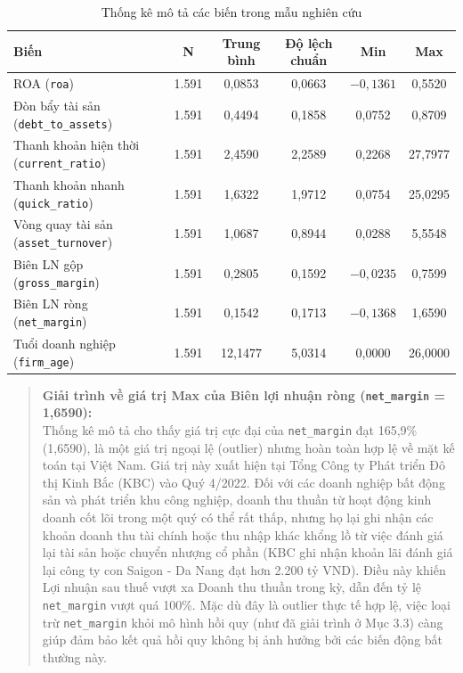 \documentclass[12pt,a4paper]{article}
\begin{document}
\begin{table}[htbp]
\centering
\caption{Thống kê mô tả các biến trong mẫu nghiên cứu}
\label{tab:descriptive}
\begin{tabular}{lccccc}
\toprule
\textbf{Biến} & \textbf{N} & \textbf{Trung bình} & \textbf{Độ lệch chuẩn} & \textbf{Min} & \textbf{Max} \\
\midrule
ROA (\texttt{roa}) & 1.591 & 0,0853 & 0,0663 & $-0,1361$ & 0,5520 \\
Đòn bẩy tài sản (\texttt{debt\_to\_assets}) & 1.591 & 0,4494 & 0,1858 & 0,0752 & 0,8709 \\
Thanh khoản hiện thời (\texttt{current\_ratio}) & 1.591 & 2,4590 & 2,2589 & 0,2268 & 27,7977 \\
Thanh khoản nhanh (\texttt{quick\_ratio}) & 1.591 & 1,6322 & 1,9712 & 0,0754 & 25,0295 \\
Vòng quay tài sản (\texttt{asset\_turnover}) & 1.591 & 1,0687 & 0,8944 & 0,0288 & 5,5548 \\
Biên LN gộp (\texttt{gross\_margin}) & 1.591 & 0,2805 & 0,1592 & $-0,0235$ & 0,7599 \\
Biên LN ròng (\texttt{net\_margin}) & 1.591 & 0,1542 & 0,1713 & $-0,1368$ & 1,6590 \\
Tuổi doanh nghiệp (\texttt{firm\_age}) & 1.591 & 12,1477 & 5,0314 & 0,0000 & 26,0000 \\
\bottomrule
\end{tabular}
\end{table}

\begin{quote}
\textbf{Giải trình về giá trị Max của Biên lợi nhuận ròng (\texttt{net\_margin} = 1,6590):} \\
Thống kê mô tả cho thấy giá trị cực đại của \texttt{net\_margin} đạt 165,9\% (1,6590), là một giá trị ngoại lệ (outlier) nhưng hoàn toàn hợp lệ về mặt kế toán tại Việt Nam. Giá trị này xuất hiện tại Tổng Công ty Phát triển Đô thị Kinh Bắc (KBC) vào Quý 4/2022. Đối với các doanh nghiệp bất động sản và phát triển khu công nghiệp, doanh thu thuần từ hoạt động kinh doanh cốt lõi trong một quý có thể rất thấp, nhưng họ lại ghi nhận các khoản doanh thu tài chính hoặc thu nhập khác khổng lồ từ việc đánh giá lại tài sản hoặc chuyển nhượng cổ phần (KBC ghi nhận khoản lãi đánh giá lại công ty con Saigon - Da Nang đạt hơn 2.200 tỷ VND). Điều này khiến Lợi nhuận sau thuế vượt xa Doanh thu thuần trong kỳ, dẫn đến tỷ lệ \texttt{net\_margin} vượt quá 100\%. Mặc dù đây là outlier thực tế hợp lệ, việc loại trừ \texttt{net\_margin} khỏi mô hình hồi quy (như đã giải trình ở Mục 3.3) càng giúp đảm bảo kết quả hồi quy không bị ảnh hưởng bởi các biến động bất thường này.
\end{quote}
\end{document}
